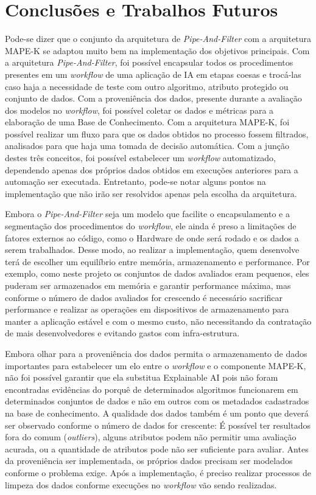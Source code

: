 \documentclass[twocolumn]{article}
\begin{document}
\section{Conclusões e Trabalhos Futuros}

Pode-se dizer que o conjunto da arquitetura de \textit{Pipe-And-Filter} com a arquitetura MAPE-K se adaptou muito bem na implementação dos objetivos principais. Com a arquitetura \textit{Pipe-And-Filter}, foi possível encapsular todos os procedimentos presentes em um \textit{workflow} de uma aplicação de IA em etapas coesas e trocá-las caso haja a necessidade de teste com outro algoritmo, atributo protegido ou conjunto de dados. Com a proveniência dos dados, presente durante a avaliação dos modelos no \textit{workflow}, foi possível coletar os dados e métricas para a elaboração de uma Base de Conhecimento. Com a arquitetura MAPE-K, foi possível realizar um fluxo para que os dados obtidos no processo fossem filtrados, analisados para que haja uma tomada de decisão automática. Com a junção destes três conceitos, foi possível estabelecer um \textit{workflow} automatizado, dependendo apenas dos próprios dados obtidos em execuções anteriores para a automação ser executada. Entretanto, pode-se notar alguns pontos na implementação que não irão ser resolvidos apenas pela escolha da arquitetura.

Embora o \textit{Pipe-And-Filter} seja um modelo que facilite o encapsulamento e a segmentação dos procedimentos do \textit{workflow}, ele ainda é preso a limitações de fatores externos ao código, como o Hardware de onde será rodado e os dados a serem trabalhados. Desse modo, ao realizar a implementação, quem desenvolve terá de escolher um equilíbrio entre memória, armazenamento e performance. Por exemplo, como neste projeto os conjuntos de dados avaliados eram pequenos, eles puderam ser armazenados em memória e garantir performance máxima, mas conforme o número de dados avaliados for crescendo é necessário sacrificar performance e realizar as operações em dispositivos de armazenamento para manter a aplicação estável e com o mesmo custo, não necessitando da contratação de mais desenvolvedores e evitando gastos com infra-estrutura.

Embora olhar para a proveniência dos dados permita o armazenamento de dados importantes para estabelecer um elo entre o \textit{workflow} e o componente MAPE-K, não foi possível garantir que ela substitua Explainable AI pois não foram encontradas evidências do porquê de determinados algoritmos funcionarem em determinados conjuntos de dados e não em outros com os metadados cadastrados na base de conhecimento. A qualidade dos dados também é um ponto que deverá ser observado conforme o número de dados for crescente: É possível ter resultados fora do comum (\textit{outliers}), alguns atributos podem não permitir uma avaliação acurada, ou a quantidade de atributos pode não ser suficiente para avaliar. Antes da proveniência ser implementada, os próprios dados precisam ser modelados conforme o problema exige. Após a implementação, é preciso realizar processos de limpeza dos dados conforme execuções no \textit{workflow} vão sendo realizadas.
\end{document}
